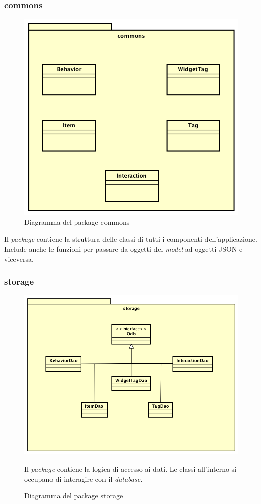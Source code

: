 \newpage
	\subsubsection*{commons}
	\begin{figure}[h]
	\centering
	\includegraphics[width=0.6\linewidth]{immagini/tres-commons}
	\caption[Diagramma del package commons]{Diagramma del package commons}
	\label{fig:tres-commons}
	\end{figure}
	Il \textit{package} contiene la struttura delle classi di tutti i componenti dell'applicazione. Include anche le funzioni per passare da oggetti del \textit{model} ad oggetti \gls{JSON} e viceversa.
	
\subsubsection*{storage}
	\begin{figure}[h]
	\centering
	\includegraphics[width=0.6\linewidth]{immagini/tres-storage}
	\caption[Diagramma del package storage]{Diagramma del package storage}
	\label{fig:tres-storage}
	Il \textit{package} contiene la logica di accesso ai dati. Le classi all'interno si occupano di interagire con il \textit{database.} 
\end{figure}


